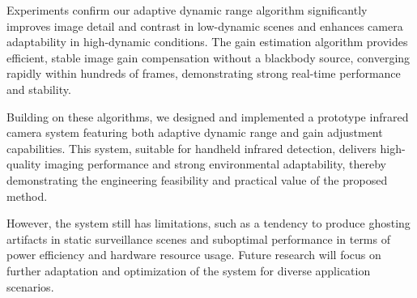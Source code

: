 \documentclass[a4paper,fleqn]{cas-dc}
\begin{document}
Experiments confirm our adaptive dynamic range algorithm significantly improves image detail and contrast in low-dynamic scenes and enhances camera adaptability in high-dynamic conditions. The gain estimation algorithm provides efficient, stable image gain compensation without a blackbody source, converging rapidly within hundreds of frames, demonstrating strong real-time performance and stability.

Building on these algorithms, we designed and implemented a prototype infrared camera system featuring both adaptive dynamic range and gain adjustment capabilities. This system, suitable for handheld infrared detection, delivers high-quality imaging performance and strong environmental adaptability, thereby demonstrating the engineering feasibility and practical value of the proposed method.

However, the system still has limitations, such as a tendency to produce ghosting artifacts in static surveillance scenes and suboptimal performance in terms of power efficiency and hardware resource usage. Future research will focus on further adaptation and optimization of the system for diverse application scenarios.







\end{document}
